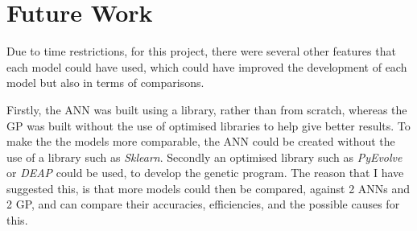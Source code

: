\documentclass[11pt]{article}
\begin{document}

\newpage
\section{Future Work}
Due to time restrictions, for this project, there were several other features that each model could have used, which could have improved the development of each model but also in terms of comparisons. 

Firstly, the ANN was built using a library, rather than from scratch, whereas the GP was built without the use of optimised libraries to help give better results. To make the the models more comparable, the ANN could be created without the use of a library such as \textit{Sklearn}. Secondly an optimised library such as \textit{PyEvolve} or \textit{DEAP} could be used, to develop the genetic program. The reason that I have suggested this, is that more models could then be compared, against 2 ANNs and 2 GP, and can compare their accuracies, efficiencies, and the possible causes for this. 
\end{document}
